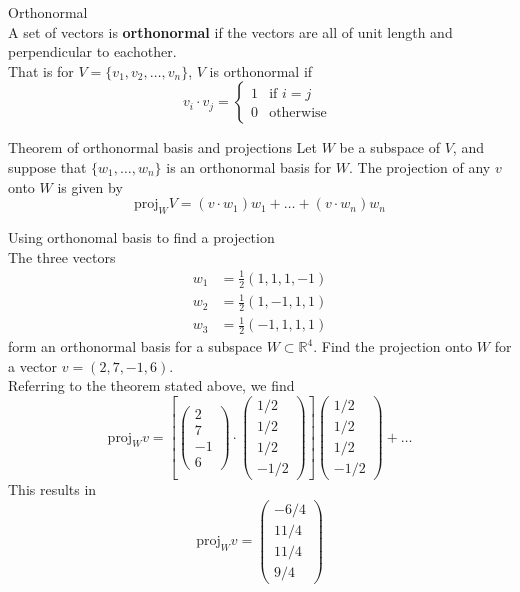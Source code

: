 \documentclass[journal, letterpaper]{IEEEtran}
\begin{document}
    \begin{mybox}{Orthonormal} \\   
        A set of vectors is \textbf{orthonormal} if the vectors are all of unit length and perpendicular to eachother.
        \newline \\ 
        That is for $ V = \{v_1, v_2, \dots, v_n\}$, $V$ is orthonormal if
        $$ v_i \cdot v_j = \begin{cases}
            1 & \text{if } i = j \\ 
            0 & \text{otherwise }
        \end{cases}$$
    \end{mybox}
    \begin{myboxr}{Theorem of orthonormal basis and projections}
        Let $W$ be a subspace of $V$, and suppose that $\{w_1, \dots, w_n\}$ is an orthonormal basis for $W$. The projection of any $v$ onto $W$ is given by
        $$ \text{proj}_WV = (v \cdot w_1)w_1 + \dots + (v \cdot w_n)w_n$$
    \end{myboxr}
    \begin{myboxg}{Using orthonomal basis to find a projection} \\ 
        The three vectors
        \begin{align*}
            w_1 &= \frac{1}{2}(1, 1, 1, -1) \\
            w_2 &= \frac{1}{2}(1, -1, 1, 1) \\ 
            w_3 &= \frac{1}{2}(-1, 1, 1, 1)
        \end{align*}
        form an orthonormal basis for a subspace $W \subset \mathbb{R}^4$. Find the projection onto $W$ for a vector $v = (2, 7, -1, 6)$.
        \newline \\ 
        Referring to the theorem stated above, we find
        $$
            \text{proj}_W v = \left[\begin{pmatrix}
                2 \\ 7 \\ -1 \\ 6
            \end{pmatrix} \cdot \begin{pmatrix}
                1/2 \\ 1/2 \\ 1/2 \\ -1/2
            \end{pmatrix}\right] \begin{pmatrix}
                1/2 \\ 1/2 \\ 1/2 \\ -1/2
            \end{pmatrix} + \dots
        $$
        This results in
        $$
            \text{proj}_Wv = \begin{pmatrix}
                -6/4 \\ 11 / 4 \\ 11 / 4 \\ 9/4
            \end{pmatrix}
        $$
    \end{myboxg}
\end{document}
